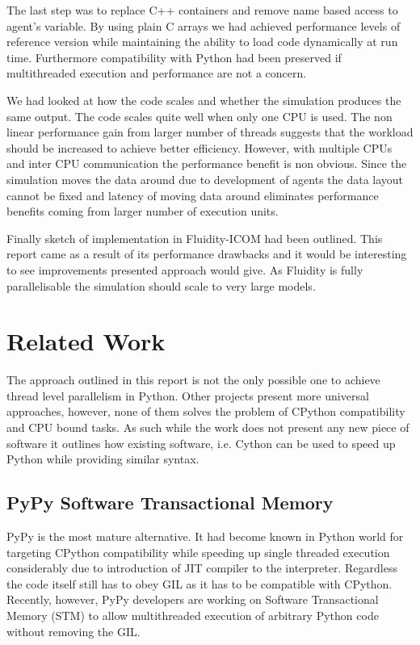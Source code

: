 \documentclass[12pt, a4paper]{report}
\begin{document}
The last step was to replace C++ containers and remove name based access
to agent's variable. By using plain C arrays we had achieved performance
levels of reference version while maintaining the ability to load code
dynamically at run time. Furthermore compatibility with Python had been
preserved if multithreaded execution and performance are not a concern.

We had looked at how the code scales and whether the simulation produces
the same output. The code scales quite well when only one CPU is used.
The non linear performance gain from larger number of threads suggests
that the workload should be increased to achieve better efficiency.
However, with multiple CPUs and inter CPU communication the performance
benefit is non obvious. Since the simulation moves the data around
due to development of agents the data layout cannot be fixed and
latency of moving data around eliminates performance benefits coming
from larger number of execution units.

Finally sketch of implementation in Fluidity-ICOM had been outlined.
This report came as a result of its performance drawbacks and it
would be interesting to see improvements presented approach would
give. As Fluidity is fully parallelisable the simulation should
scale to very large models.

\section{Related Work}\label{sec:related}
The approach outlined in this report is not the only possible one to
achieve thread level parallelism in Python. Other projects present
more universal approaches, however, none of them solves the problem
of CPython compatibility and CPU bound tasks. As such while the work
does not present any new piece of software it outlines how existing
software, i.e. Cython can be used to speed up Python while providing
similar syntax.

\subsection{PyPy Software Transactional Memory}\label{subsec:pypy-stm}
PyPy is the most mature alternative. It had become known in Python
world for targeting CPython compatibility while speeding up single
threaded execution considerably due to introduction of JIT compiler
to the interpreter. Regardless the code itself still has to obey
GIL as it has to be compatible with CPython. Recently, however,
PyPy developers are working on Software Transactional Memory (STM)
to allow multithreaded execution of arbitrary Python code without
removing the GIL.
\end{document}
